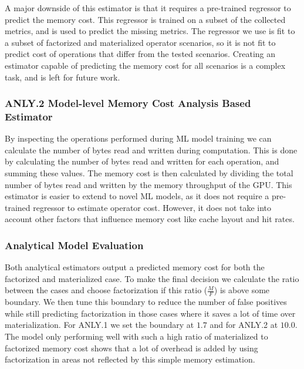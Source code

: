 A major downside of this estimator is that it requires a pre-trained regressor to predict the memory cost. This regressor is trained on a subset of the collected metrics, and is used to predict the missing metrics. The regressor we use is fit to a subset of factorized and materialized operator scenarios, so it is not fit to predict cost of operations that differ from the tested scenarios. Creating an estimator capable of predicting the memory cost for all scenarios is a complex task, and is left for future work.

\subsubsection*{ANLY.2 Model-level Memory Cost Analysis Based Estimator}
By inspecting the operations performed during ML model training we can calculate the number of bytes read and written during computation. This is done by calculating the number of bytes read and written for each operation, and summing these values. The memory cost is then calculated by dividing the total number of bytes read and written by the memory throughput of the GPU. This estimator is easier to extend to novel ML models, as it does not require a pre-trained regressor to estimate operator cost. However, it does not take into account other factors that influence memory cost like cache layout and hit rates.

\subsubsection*{Analytical Model Evaluation}
Both analytical estimators output a predicted memory cost for both the factorized and materialized case. To make the final decision we calculate the ratio between the cases and choose factorization if this ratio ($\frac{M}{F}$) is above some boundary. We then tune this boundary to reduce the number of false positives while still predicting factorization in those cases where it saves a lot of time over materialization. For ANLY.1 we set the boundary at $1.7$ and for ANLY.2 at $10.0$. The model only performing well with such a high ratio of materialized to factorized memory cost shows that a lot of overhead is added by using factorization in areas not reflected by this simple memory estimation.

